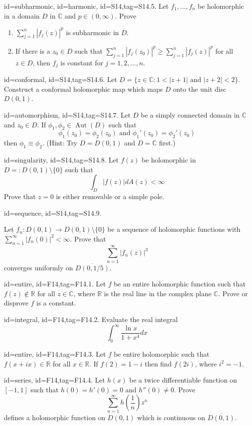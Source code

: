 \documentclass[12pt,letterpaper]{article}
\theoremstyle{plain}
\theoremstyle{definition}
\DeclareMathOperator{\Aut}{Aut}
\begin{document}
{\item[id=subharmonic, id=harmonic, id=S14,tag=S14.5.]
Let $f_1,\ldots, f_n$ be holomorphic in a domain $D$ in $\mathbb{C}$ and $p \in (0,\infty)$. Prove
\begin{enumerate}[label=(\alph*)]\onlyitems
\item $\sum_{j=1}^{n} | f_j(z) |^p$ is subharmonic in $D$.
\item If there is a $z_0 \in D$ such that $\sum_{j=1}^{n} | f_j(z_0) |^p \ge \sum_{j=1}^{n} | f_j(z) |^p$ for all $z \in D$, then $f_j$ is constant for $j = 1,2,\ldots, n$.
\end{enumerate}

\item[id=conformal, id=S14,tag=S14.6.]
Let $D = \{z \in \mathbb{C} \colon 1 < | z + 1 | \text{ and } | z + 2 | < 2 \}$. Construct a conformal holomorphic map which maps $D$ onto the unit disc $D(0,1)$.

\item[id=automorphism, id=S14,tag=S14.7.]
Let $D$ be a simply connected domain in $\mathbb{C}$ and $z_0 \in D$. If $\phi_1, \phi_2 \in \Aut(D)$ such that
\[
	\phi_1(z_0) = \phi_2(z_0) \text{ and } \phi_1'(z_0) = \phi_2'(z_0)
\]
then $\phi_1 \equiv \phi_2$. (Hint: Try $D = D(0,1)$ and $D = \mathbb{C}$ first.)

\item[id=singularity, id=S14,tag=S14.8.]
Let $f(z)$ be holomorphic in $D =: D(0,1) \setminus \{0\}$ such that
\[
	\int_{D} | f(z) | dA(z) < \infty
\]
Prove that $z = 0$ is either removable or a simple pole.

\item[id=sequence, id=S14,tag=S14.9.]

Let $f_n : D(0,1) \rightarrow D(0,1) \setminus \{0\}$ be a sequence of holomorphic functions with $\sum_{n=1}^{\infty} | f_n(0) |^2 < \infty$. Prove that
\[
	\sum_{n=1}^{\infty} | f_n(z) |^3
\]
converges uniformly on $\overline{D(0,1/5)}.$


\item[id=entire, id=F14,tag=F14.1.]
Let $f$ be an entire holomorphic function such that $f(z) \notin \mathbb{R}$ for all $z \in \mathbb{C}$, where $\mathbb{R}$ is the real line in the complex plane $\mathbb{C}$. Prove or disprove $f$ is a constant.
\item[id=integral, id=F14,tag=F14.2.]
Evaluate the real integral
\[
	\int_{0}^{\infty} \frac{\ln x}{1 + x^4} dx
\]
\item[id=entire, id=F14,tag=F14.3.]
Let $f$ be entire holomorphic such that $f(x+ix) \in \mathbb{R}$ for all $x \in \mathbb{R}$. If $f(2) = 1 - i$ then find $f(2i)$, where $i^2 = -1$.
\item[id=series, id=F14,tag=F14.4.]
Let $h(x)$ be a twice differentiable function on $[-1,1]$ such that $h(0) = h'(0) = 0$ and $h''(0) \ne 0$. Prove
\[
	\sum_{n=1}^{\infty} h\left(\frac{1}{n}\right) z^n
\]
defines a holomorphic function on $D(0,1)$ which is continuous on $\overline{D(0,1)}.$

}
\end{document}
